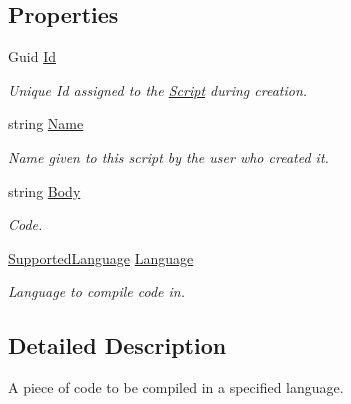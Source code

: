 \subsection*{Properties}
\begin{DoxyCompactItemize}
\item 
Guid \mbox{\hyperlink{class_code_a_friend_1_1_data_model_1_1_script_a91e1a0a804f19d83f904871d33998ce7}{Id}}
\begin{DoxyCompactList}\small\item\em Unique Id assigned to the \mbox{\hyperlink{class_code_a_friend_1_1_data_model_1_1_script}{Script}} during creation.\end{DoxyCompactList}\item 
string \mbox{\hyperlink{class_code_a_friend_1_1_data_model_1_1_script_aa075f49454db91a785b8147c2b85bb54}{Name}}
\begin{DoxyCompactList}\small\item\em Name given to this script by the user who created it.\end{DoxyCompactList}\item 
string \mbox{\hyperlink{class_code_a_friend_1_1_data_model_1_1_script_a8d73e309856111b7666fe48f1b613eda}{Body}}
\begin{DoxyCompactList}\small\item\em Code.\end{DoxyCompactList}\item 
\mbox{\hyperlink{namespace_code_a_friend_1_1_data_model_a13e088c525db1b03a4de75420ced79b2}{Supported\+Language}} \mbox{\hyperlink{class_code_a_friend_1_1_data_model_1_1_script_a02cc66f28767d1548f3b153d4c2e1840}{Language}}
\begin{DoxyCompactList}\small\item\em Language to compile code in.\end{DoxyCompactList}\end{DoxyCompactItemize}


\subsection{Detailed Description}
A piece of code to be compiled in a specified language. 



